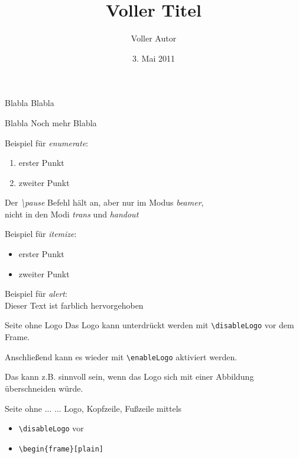 \documentclass{beamer}           %
\title[Kurztitel]{Voller Titel}
\author[Kurzautor]{Voller Autor}
\institute{Hochschule Niederhein - Fachbereich Elektrotechnik \& Informatik}
\date{3. Mai 2011}
\begin{document}
\frame[plain]{\titlepage}



\begin{frame}{Blabla}  
Blabla

\begin{block}{Blabla}
Noch mehr Blabla
\end{block}

Beispiel für {\em enumerate}:
\begin{enumerate}
\item erster Punkt
\item zweiter Punkt
\end{enumerate}

\vspace{1ex}
Der {\em \textbackslash pause} Befehl hält an, aber
nur im Modus {\em beamer},\\
nicht in den Modi {\em trans} und {\em handout}
\pause

\vspace{1ex}
Beispiel für {\em itemize}:
\begin{itemize}
\item erster Punkt
\item zweiter Punkt
\end{itemize}

\vspace{1ex}
Beispiel für {\em alert}:\\
Dieser Text ist \alert{farblich hervorgehoben}

\end{frame}


\disableLogo
\begin{frame}{Seite ohne Logo}
   Das Logo kann unterdrückt werden mit {\tt \textbackslash disableLogo}
   vor dem Frame.

   Anschließend kann es wieder mit {\tt \textbackslash enableLogo}
   aktiviert werden.

   \vspace{1ex}
   Das kann z.B. sinnvoll sein, wenn das Logo sich mit einer Abbildung
   überschneiden würde.
\end{frame}
\enableLogo


\disableLogo
\begin{frame}[plain]{Seite ohne ...}
   ... Logo, Kopfzeile, Fußzeile mittels
   \begin{itemize}
   \item {\tt \textbackslash disableLogo} vor
   \item {\tt \textbackslash begin\{frame\}[plain]}
   \end{itemize}
\end{frame}
\enableLogo
\end{document}
